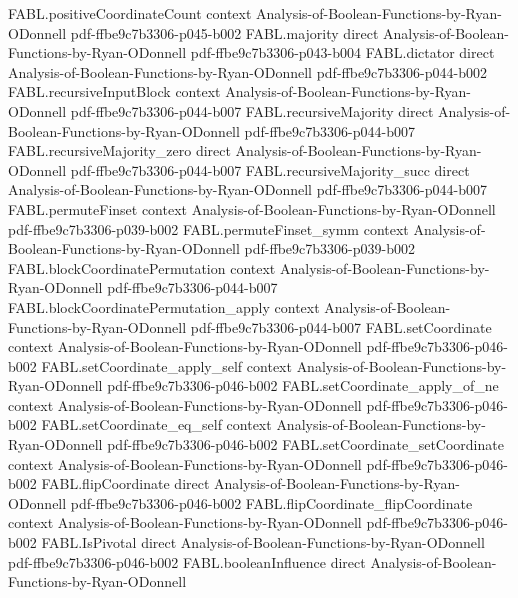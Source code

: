 \begin{theorem}
\proofstep
  {FABL.positiveCoordinateCount}
  {context}
  {Analysis-of-Boolean-Functions-by-Ryan-ODonnell}
  {pdf-ffbe9c7b3306-p045-b002}
\proofstep
  {FABL.majority}
  {direct}
  {Analysis-of-Boolean-Functions-by-Ryan-ODonnell}
  {pdf-ffbe9c7b3306-p043-b004}
\proofstep
  {FABL.dictator}
  {direct}
  {Analysis-of-Boolean-Functions-by-Ryan-ODonnell}
  {pdf-ffbe9c7b3306-p044-b002}
\proofstep
  {FABL.recursiveInputBlock}
  {context}
  {Analysis-of-Boolean-Functions-by-Ryan-ODonnell}
  {pdf-ffbe9c7b3306-p044-b007}
\proofstep
  {FABL.recursiveMajority}
  {direct}
  {Analysis-of-Boolean-Functions-by-Ryan-ODonnell}
  {pdf-ffbe9c7b3306-p044-b007}
\proofstep
  {FABL.recursiveMajority_zero}
  {direct}
  {Analysis-of-Boolean-Functions-by-Ryan-ODonnell}
  {pdf-ffbe9c7b3306-p044-b007}
\proofstep
  {FABL.recursiveMajority_succ}
  {direct}
  {Analysis-of-Boolean-Functions-by-Ryan-ODonnell}
  {pdf-ffbe9c7b3306-p044-b007}
\proofstep
  {FABL.permuteFinset}
  {context}
  {Analysis-of-Boolean-Functions-by-Ryan-ODonnell}
  {pdf-ffbe9c7b3306-p039-b002}
\proofstep
  {FABL.permuteFinset_symm}
  {context}
  {Analysis-of-Boolean-Functions-by-Ryan-ODonnell}
  {pdf-ffbe9c7b3306-p039-b002}
\proofstep
  {FABL.blockCoordinatePermutation}
  {context}
  {Analysis-of-Boolean-Functions-by-Ryan-ODonnell}
  {pdf-ffbe9c7b3306-p044-b007}
\proofstep
  {FABL.blockCoordinatePermutation_apply}
  {context}
  {Analysis-of-Boolean-Functions-by-Ryan-ODonnell}
  {pdf-ffbe9c7b3306-p044-b007}
\proofstep
  {FABL.setCoordinate}
  {context}
  {Analysis-of-Boolean-Functions-by-Ryan-ODonnell}
  {pdf-ffbe9c7b3306-p046-b002}
\proofstep
  {FABL.setCoordinate_apply_self}
  {context}
  {Analysis-of-Boolean-Functions-by-Ryan-ODonnell}
  {pdf-ffbe9c7b3306-p046-b002}
\proofstep
  {FABL.setCoordinate_apply_of_ne}
  {context}
  {Analysis-of-Boolean-Functions-by-Ryan-ODonnell}
  {pdf-ffbe9c7b3306-p046-b002}
\proofstep
  {FABL.setCoordinate_eq_self}
  {context}
  {Analysis-of-Boolean-Functions-by-Ryan-ODonnell}
  {pdf-ffbe9c7b3306-p046-b002}
\proofstep
  {FABL.setCoordinate_setCoordinate}
  {context}
  {Analysis-of-Boolean-Functions-by-Ryan-ODonnell}
  {pdf-ffbe9c7b3306-p046-b002}
\proofstep
  {FABL.flipCoordinate}
  {direct}
  {Analysis-of-Boolean-Functions-by-Ryan-ODonnell}
  {pdf-ffbe9c7b3306-p046-b002}
\proofstep
  {FABL.flipCoordinate_flipCoordinate}
  {context}
  {Analysis-of-Boolean-Functions-by-Ryan-ODonnell}
  {pdf-ffbe9c7b3306-p046-b002}
\proofstep
  {FABL.IsPivotal}
  {direct}
  {Analysis-of-Boolean-Functions-by-Ryan-ODonnell}
  {pdf-ffbe9c7b3306-p046-b002}
\proofstep
  {FABL.booleanInfluence}
  {direct}
  {Analysis-of-Boolean-Functions-by-Ryan-ODonnell}

\end{theorem}
